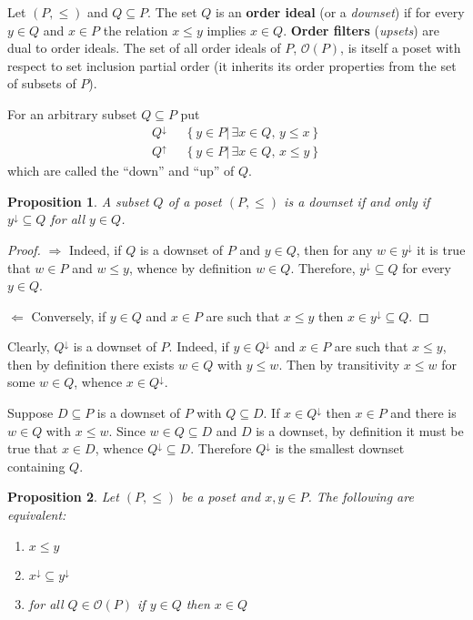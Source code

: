\documentclass[a4paper]{article}
\newcommand{\obj}[1]{{\left\{ #1 \right \}}}
\newcommand{\induc}[1]{{\left . #1 \right \vert}}
\newcommand{\Ocal}{\mathcal{O}}
\newtheorem{prop}{Proposition}
\newcommand{\defn}{\mathop{\overset{\Delta}{=}}\nolimits}
\begin{document}
Let $(P,\leq)$ and $Q\subseteq P$. The set $Q$ is an \textbf{order ideal} (or a \emph{downset}) if for every $y\in Q$ and $x\in P$ the relation $x\leq y$ implies $x\in Q$. \textbf{Order filters} (\emph{upsets}) are dual to order ideals. The set of all order ideals of $P$, $\Ocal(P)$, is itself a poset with respect to set inclusion partial order (it inherits its order properties from the set of subsets of $P$).

For an arbitrary subset $Q\subseteq P$ put \begin{align*}
	Q^\downarrow &\defn \obj{ \induc{ y\in P }\,\exists x\in Q,\, y\leq x }\\
	Q^\uparrow &\defn \obj{ \induc{ y\in P }\,\exists x\in Q,\, x\leq y }
\end{align*}
which are called the ``down'' and ``up'' of $Q$.

\begin{prop} A subset $Q$ of a poset $(P,\leq)$ is a downset if and only if $y^\downarrow\subseteq Q$ for all $y\in Q$.
\end{prop}

\begin{proof}
$\Rightarrow$ Indeed, if $Q$ is a downset of $P$ and $y\in Q$, then for any $w\in y^\downarrow$ it is true that $w\in P$ and $w\leq y$, whence by definition $w\in Q$. Therefore, $y^\downarrow\subseteq Q$ for every $y\in Q$.

$\Leftarrow$ Conversely, if $y\in Q$ and $x\in P$ are such that $x\leq y$ then $x\in y^\downarrow\subseteq Q$.
\end{proof}

Clearly, $Q^\downarrow$ is a downset of $P$. Indeed, if $y\in Q^\downarrow$ and $x\in P$ are such that $x\leq y$, then by definition there exists $w\in Q$ with $y\leq w$. Then by transitivity $x\leq w$ for some $w\in Q$, whence $x\in Q^\downarrow$.

Suppose $D\subseteq P$ is a downset of $P$ with $Q\subseteq D$. If $x\in Q^\downarrow$ then $x\in P$ and there is $w\in Q$ with $x\leq w$. Since $w\in Q\subseteq D$ and $D$ is a downset, by definition it must be true that $x\in D$, whence $Q^\downarrow\subseteq D$. Therefore $Q^\downarrow$ is the smallest downset containing $Q$.

\begin{prop} Let $(P,\leq)$ be a poset and $x,y\in P$. The following are equivalent: \begin{enumerate}
	\item $x\leq y$
	\item $x^\downarrow\subseteq y^\downarrow$
	\item for all $Q\in \Ocal(P)$ if $y\in Q$ then $x\in Q$
\end{enumerate}
\end{prop}
\end{document}
